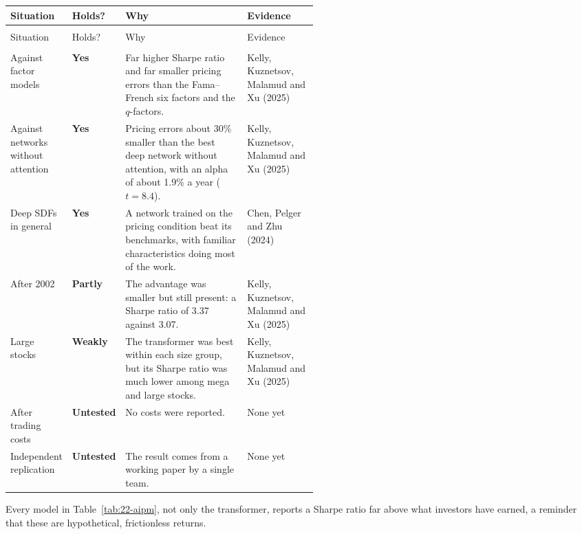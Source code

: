 {\small
\begin{longtable}{@{}>{\raggedright\arraybackslash}p{0.19\linewidth}>{\raggedright\arraybackslash}p{0.10\linewidth}>{\raggedright\arraybackslash}p{}>{\raggedright\arraybackslash}p{0.23\linewidth}@{}}
\toprule
Situation & Holds? & Why & Evidence \\
\midrule
\endfirsthead
\multicolumn{4}{@{}l}{\emph{(continued)}} \\
\toprule
Situation & Holds? & Why & Evidence \\
\midrule
\endhead
\midrule
\multicolumn{4}{r@{}}{\emph{(continued on the next page)}} \\
\endfoot
\bottomrule
\endlastfoot
Against factor models & \textbf{Yes} & Far higher Sharpe ratio and far smaller pricing errors than the Fama--French six factors and the $q$-factors. & Kelly, Kuznetsov, Malamud and Xu (2025) \\
\addlinespace[3pt]
Against networks without attention & \textbf{Yes} & Pricing errors about 30\% smaller than the best deep network without attention, with an alpha of about 1.9\% a year ($t = 8.4$). & Kelly, Kuznetsov, Malamud and Xu (2025) \\
\addlinespace[3pt]
Deep SDFs in general & \textbf{Yes} & A network trained on the pricing condition beat its benchmarks, with familiar characteristics doing most of the work. & Chen, Pelger and Zhu (2024) \\
\addlinespace[3pt]
After 2002 & \textbf{Partly} & The advantage was smaller but still present: a Sharpe ratio of 3.37 against 3.07. & Kelly, Kuznetsov, Malamud and Xu (2025) \\
\addlinespace[3pt]
Large stocks & \textbf{Weakly} & The transformer was best within each size group, but its Sharpe ratio was much lower among mega and large stocks. & Kelly, Kuznetsov, Malamud and Xu (2025) \\
\addlinespace[3pt]
After trading costs & \textbf{Untested} & No costs were reported. & None yet \\
\addlinespace[3pt]
Independent replication & \textbf{Untested} & The result comes from a working paper by a single team. & None yet \\
\end{longtable}
}

Every model in Table~\ref{tab:22-aipm}, not only the transformer, reports a Sharpe ratio far above what investors have earned, a reminder that these are hypothetical, frictionless returns.

